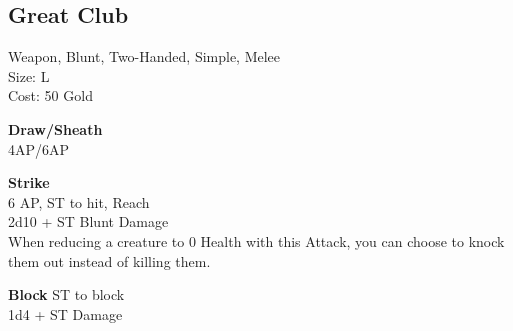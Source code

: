 \subsection{Great Club}\label{weapon:greatClub}
Weapon, Blunt, Two-Handed, Simple, Melee\\
Size: L\\
Cost: 50 Gold

\textbf{Draw/Sheath}\\
4AP/6AP

\textbf{Strike} \\
6 AP, ST to hit,  Reach\\
2d10 + \texttimes ST Blunt Damage\\
When reducing a creature to 0 Health with this Attack, you can choose to knock them out instead of killing them.

\textbf{Block}
ST to block\\
1d4 + \texttimes ST Damage

